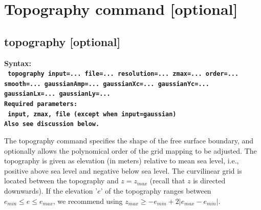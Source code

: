 \documentclass[11pt]{report}
\begin{document}
\section{Topography command [optional]}

\subsection{topography [optional]}
\label{keyword:topo}
\begin{flushleft}
\bf
Syntax:\\
\tt 
topography input=... file=... resolution=... zmax=... order=... smooth=... gaussianAmp=... gaussianXc=... gaussianYc=... gaussianLx=... gaussianLy=...\\
\bf 
Required parameters:\\
\tt 
input, zmax, file (except when input=gaussian)\\
\rm Also see discussion below.
\end{flushleft}
The topography command specifies the shape of the free surface boundary, and optionally allows the
polynomical order of the grid mapping to be adjusted. The topography is given as elevation (in
meters) relative to mean sea level, i.e., positive above sea level and negative below sea level. The
curvilinear grid is located between the topography and $z=z_{max}$ (recall that $z$ is directed
downwards). If the elevation '$e$' of the topography ranges between $e_{min}\leq e \leq e_{max}$, we
recommend using $z_{max} \geq -e_{min} + 2|e_{max} - e_{min}|$.
\end{document}
